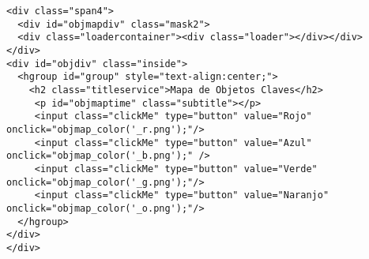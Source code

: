 \begin{enumerate}[label=\alph*) ,font=\bfseries]
\begin{lstlisting}[style=Java, caption={Contenido \textit{HTML} donde se aloja el Mapa de Objetos.}]
<div class="span4">
  <div id="objmapdiv" class="mask2">
  <div class="loadercontainer"><div class="loader"></div></div>
</div>
<div id="objdiv" class="inside">
  <hgroup id="group" style="text-align:center;">
    <h2 class="titleservice">Mapa de Objetos Claves</h2>
     <p id="objmaptime" class="subtitle"></p>
     <input class="clickMe" type="button" value="Rojo" onclick="objmap_color('_r.png');"/>
     <input class="clickMe" type="button" value="Azul" onclick="objmap_color('_b.png');" />
     <input class="clickMe" type="button" value="Verde" onclick="objmap_color('_g.png');"/>
     <input class="clickMe" type="button" value="Naranjo" onclick="objmap_color('_o.png');"/> 
  </hgroup>
</div>                        
</div>
\end{lstlisting}
\end{enumerate}



\newpage
